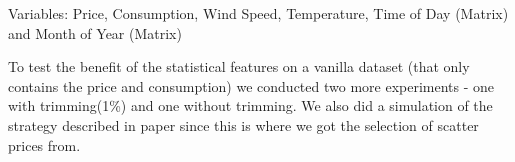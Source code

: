 Variables: Price, Consumption, Wind Speed, Temperature, Time of Day (Matrix) and Month of Year (Matrix)
\begin{table}[H]
\centering  %
\caption{Trims} %
\label{table:Statistical3} %
\end{table}

To test the benefit of the statistical features on a vanilla dataset (that only contains the price and consumption) we conducted two more experiments - one with trimming(1\%) and one without trimming. We also did a simulation of the strategy described in paper \cite{singhal2011electricity} since this is where we got the selection of scatter prices from.

